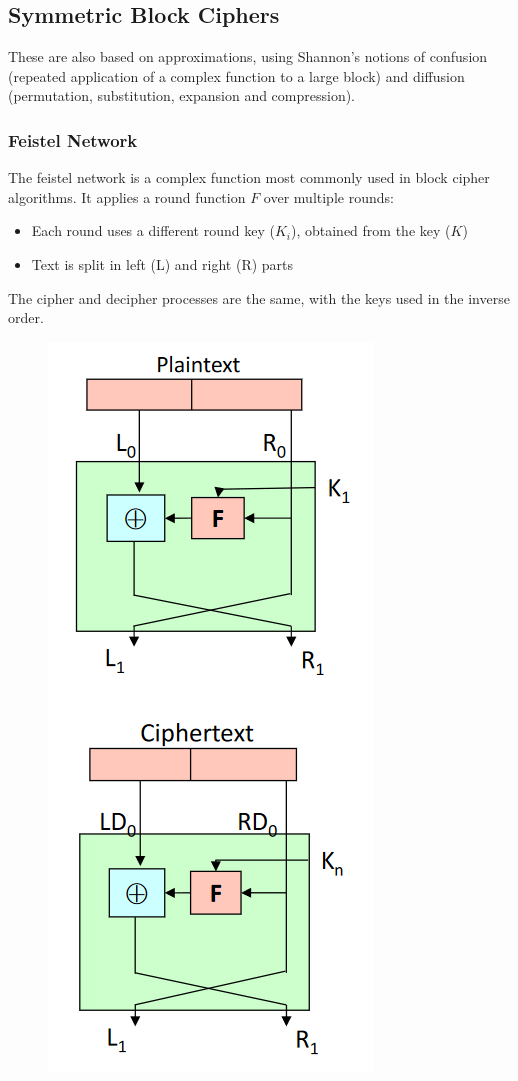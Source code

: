 \documentclass[10pt,a4paper]{report}
\begin{document}
\subsection{Symmetric Block Ciphers}
These are also  based on approximations, using Shannon’s notions of confusion (repeated application of a complex function to a large block) and diffusion (permutation, substitution, expansion and compression).
\subsubsection{Feistel Network}
The feistel network is a complex  function most commonly
used in block cipher algorithms. It applies a round function $F$ over multiple rounds:
\begin{itemize}
\item Each round uses a different round key ($K_i$), obtained from the key ($K$)
\item Text is split in left (L) and right (R) parts
\end{itemize}
The cipher and decipher processes are the same, with the keys used in the inverse order.
\begin{figure}[H]
\centering
\includegraphics[scale=0.4]{3.png}
\end{figure}
\end{document}
